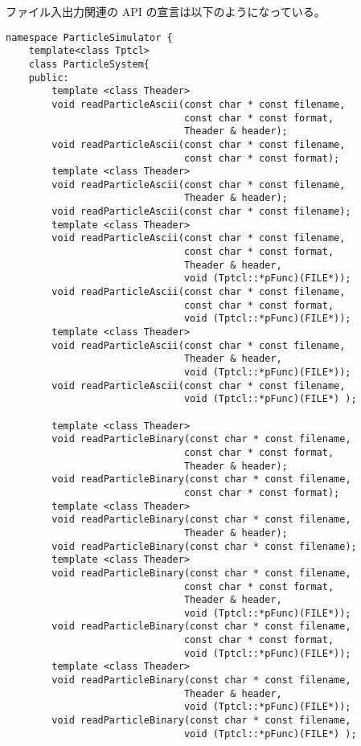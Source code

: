ファイル入出力関連の API の宣言は以下のようになっている。
\begin{lstlisting}[caption=ParticleSystem3]
namespace ParticleSimulator {
    template<class Tptcl>
    class ParticleSystem{
    public:
        template <class Theader>
        void readParticleAscii(const char * const filename,
                               const char * const format,
                               Theader & header);
        void readParticleAscii(const char * const filename,       
                               const char * const format);
        template <class Theader>
        void readParticleAscii(const char * const filename,
                               Theader & header);
        void readParticleAscii(const char * const filename);
        template <class Theader>
        void readParticleAscii(const char * const filename,
                               const char * const format,
                               Theader & header,
                               void (Tptcl::*pFunc)(FILE*));
        void readParticleAscii(const char * const filename,       
                               const char * const format,
                               void (Tptcl::*pFunc)(FILE*));
        template <class Theader>
        void readParticleAscii(const char * const filename,
                               Theader & header,
                               void (Tptcl::*pFunc)(FILE*));
        void readParticleAscii(const char * const filename,
                               void (Tptcl::*pFunc)(FILE*) );

        template <class Theader>
        void readParticleBinary(const char * const filename,
                               const char * const format,
                               Theader & header);
        void readParticleBinary(const char * const filename,       
                               const char * const format);
        template <class Theader>
        void readParticleBinary(const char * const filename,
                               Theader & header);
        void readParticleBinary(const char * const filename);
        template <class Theader>
        void readParticleBinary(const char * const filename,
                               const char * const format,
                               Theader & header,
                               void (Tptcl::*pFunc)(FILE*));
        void readParticleBinary(const char * const filename,       
                               const char * const format,
                               void (Tptcl::*pFunc)(FILE*));
        template <class Theader>
        void readParticleBinary(const char * const filename,
                               Theader & header,
                               void (Tptcl::*pFunc)(FILE*));
        void readParticleBinary(const char * const filename,
                               void (Tptcl::*pFunc)(FILE*) );


\end{lstlisting}
